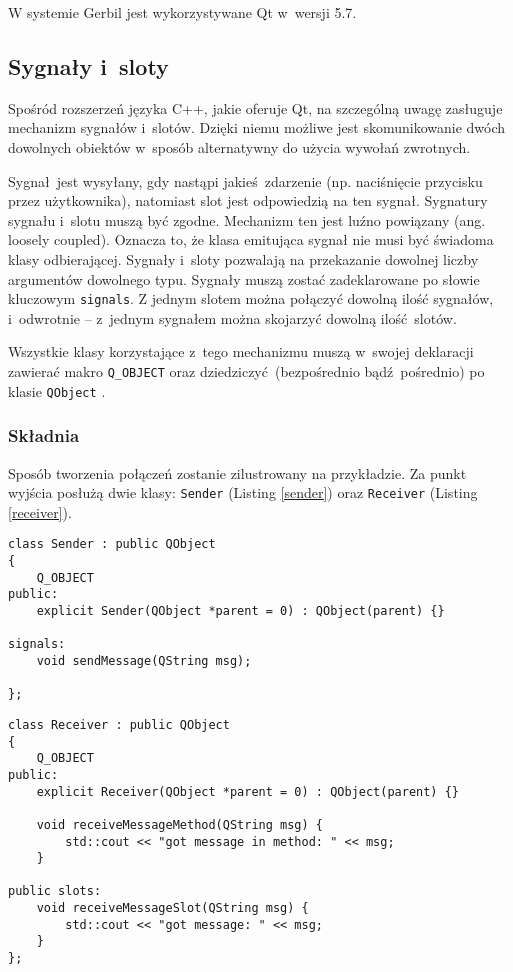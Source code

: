 W systemie Gerbil jest wykorzystywane Qt w~wersji 5.7.

  \subsection{Sygnały i~sloty}

Spośród rozszerzeń języka C++, jakie oferuje Qt, na szczególną uwagę zasługuje mechanizm sygnałów i~slotów. Dzięki niemu możliwe jest skomunikowanie dwóch dowolnych obiektów w~sposób alternatywny do użycia wywołań zwrotnych. 

Sygnał jest wysyłany, gdy nastąpi jakieś zdarzenie (np. naciśnięcie przycisku przez użytkownika), natomiast slot jest odpowiedzią na ten sygnał. Sygnatury sygnału i~slotu muszą być zgodne. Mechanizm ten jest luźno powiązany (ang. loosely coupled). Oznacza to, że klasa emitująca sygnał nie musi być świadoma klasy odbierającej. Sygnały i~sloty pozwalają na przekazanie dowolnej liczby argumentów dowolnego typu. Sygnały muszą zostać zadeklarowane po słowie kluczowym \lstinline$signals$. Z jednym slotem można połączyć dowolną ilość sygnałów, i~odwrotnie -- z~jednym sygnałem można skojarzyć dowolną ilość slotów.

Wszystkie klasy korzystające z~tego mechanizmu muszą w~swojej deklaracji zawierać makro \lstinline$Q_OBJECT$ oraz dziedziczyć (bezpośrednio bądź pośrednio) po klasie \lstinline$QObject$ \cite{Qtdoc}.


\subsubsection{Składnia} 
Sposób tworzenia połączeń zostanie zilustrowany na przykładzie. Za punkt wyjścia posłużą dwie klasy: \lstinline$Sender$ (Listing \ref{sender}) oraz \lstinline$Receiver$ (Listing \ref{receiver}).

\begin{minipage}{\textwidth}
	\begin{lstlisting}[label=sender,caption=Deklaracja klasy \lstinline$Sender$.]
class Sender : public QObject
{
	Q_OBJECT
public:
	explicit Sender(QObject *parent = 0) : QObject(parent) {}
	
signals:
	void sendMessage(QString msg);
	
};
	\end{lstlisting}
\end{minipage}

\begin{minipage}{\textwidth}
	\begin{lstlisting}[label=receiver, caption=Deklaracja klasy \lstinline$Receiver$.]
class Receiver : public QObject
{
	Q_OBJECT
public:
	explicit Receiver(QObject *parent = 0) : QObject(parent) {}
	
	void receiveMessageMethod(QString msg) {
		std::cout << "got message in method: " << msg;
	}
	
public slots:
	void receiveMessageSlot(QString msg) {
		std::cout << "got message: " << msg;
	}
};
	\end{lstlisting}
\end{minipage}

